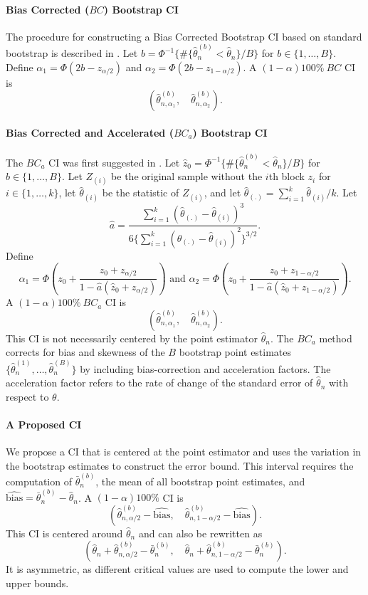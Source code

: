 \documentclass[12pt, letterpaper, titlepage]{article}
\begin{document}
\paragraph{Bias Corrected ($BC$) Bootstrap CI}
The procedure for constructing a Bias Corrected Bootstrap CI based on standard
bootstrap is described in \citet{carpenter2000bootstrap}.
Let $b = \Phi^{-1}\{\#\{\hat\theta_n^{(b)} < \hat{\theta}_n\} / B\}$
for $b \in \{1, \ldots, B\}$. Define
$\alpha_1 = \Phi(2b - z_{\alpha/2})$ and 
$\alpha_2 = \Phi(2b - z_{1 - \alpha/2})$.
A $(1 - \alpha)100\%~BC$ CI is
\[
(\hat\theta_{n, \alpha_1}^{(b)}, \quad \hat\theta_{n, \alpha_2}^{(b)}).
\]


\paragraph{Bias Corrected and Accelerated ($BC_a$) Bootstrap CI}
The $BC_a$ CI was first suggested in \citet{efron1987better}.
Let $\hat{z}_0 = \Phi^{-1}\{\#\{\hat\theta_n^{(b)} < \hat{\theta}_n\} / B\}$
for $b \in \{1, \ldots, B\}$. 
Let $Z_{(i)}$ be the original sample without the $i$th block $z_i$ for 
$i \in \{1, \ldots, k\}$, let
$\hat{\theta}_{(i)}$ be the statistic of $Z_{(i)}$,
and let $\hat{\theta}_{(.)} = \sum_{i=1}^{k} \hat{\theta}_{(i)} / k$. 
Let 
\[
\hat{a} = \frac{\sum_{i=1}^{k} (\hat{\theta}_{(.)} -
  \hat{\theta}_{(i)})^3}{6\{\sum_{i=1}^{k} (\hat{\theta}_{(.)} -
  \hat{\theta}_{(i)})^2\}^{3/2}}.
\]
Define
\[
\alpha_1 = \Phi\left(z_0 + \frac{z_{0} +
  z_{\alpha/2}}{1 - \hat{a}(\hat{z}_{0} + z_{\alpha/2})}\right)
\text{ and }
\alpha_2 = \Phi\left(z_0 + \frac{z_{0} +
  z_{1 - \alpha/2}}{1 - \hat{a}(\hat{z}_{0} + z_{1 - \alpha/2})}\right).
\]
A $(1 - \alpha)100\%~BC_a$ CI is
\[
(\hat\theta_{n, \alpha_1}^{(b)}, \quad \hat\theta_{n, \alpha_2}^{(b)}).
\]
This CI is not necessarily centered by the point estimator $\hat\theta_n$. The
$BC_a$ method corrects for bias and skewness of the $B$ bootstrap point
estimates $\{\hat\theta_n^{(1)}, \ldots, \hat\theta_n^{(B)}\}$ by including
bias-correction and acceleration factors. The acceleration factor refers to
the 
rate of change of the standard error of $\hat\theta_n$ with respect to
$\theta$.


\paragraph{A Proposed CI}
We propose a CI that is centered at the point estimator and uses the variation
in the bootstrap estimates to construct the error bound. This interval requires
the computation of $\bar\theta_n^{(b)}$, the mean of all bootstrap point
estimates, and $\widehat{\text{bias}} = \bar\theta_n^{(b)} - \hat\theta_n$.
A $(1 - \alpha)100\%$ CI is
\[
(\hat\theta_{n, \alpha/2}^{(b)} - \widehat{\text{bias}}, \quad
\hat\theta_{n, 1 - \alpha/2}^{(b)} - \widehat{\text{bias}}).
\]
This CI is centered around $\hat\theta_n$ and can also be rewritten
as 
\[
(\hat\theta_n + \hat\theta_{n, \alpha/2}^{(b)} - \bar\theta_n^{(b)}, \quad
\hat\theta_n + \hat\theta_{n, 1 - \alpha/2}^{(b)} - \bar\theta_n^{(b)}).
\]
It is asymmetric, as different critical values are used to compute
the lower and upper bounds.
\end{document}
